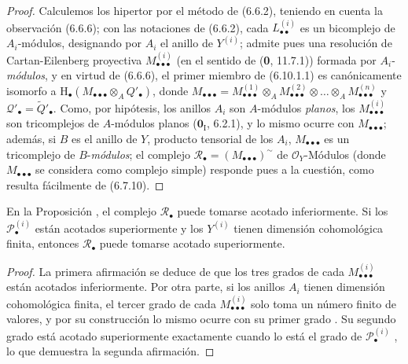 \begin{proof}
Calculemos los hipertor por el método de (6.6.2), teniendo en cuenta la observación
(6.6.6); con las notaciones de (6.6.2), cada
$L_{\bullet\bullet}^{(i)}$ es un bicomplejo de $A_i$-módulos, designando por
$A_i$ el anillo de $Y^{(i)}$; admite pues una resolución de Cartan-Eilenberg
proyectiva $M_{\bullet\bullet\bullet}^{(i)}$ (en el sentido de (\textbf{0}, 11.7.1)) formada por
$A_i$-\emph{módulos}, y en virtud de (6.6.6), el primer miembro de (6.10.1.1) es
canónicamente isomorfo a
$\mathrm H_\bullet(M_{\bullet\bullet\bullet}\otimes_A Q'_\bullet)$, donde
$M_{\bullet\bullet\bullet}=M_{\bullet\bullet\bullet}^{(1)}\otimes_A M_{\bullet\bullet\bullet}^{(2)}\otimes\ldots\otimes_A M_{\bullet\bullet\bullet}^{(n)}$
y $\mathscr Q'_\bullet=\widetilde{Q}'_\bullet$. Como, por hipótesis, los
anillos $A_i$ son $A$-módulos \emph{planos}, los
$M_{\bullet\bullet\bullet}^{(i)}$ son tricomplejos de $A$-módulos planos
($\mathbf{0}_{\mathrm I}$, 6.2.1), y lo mismo ocurre con
$M_{\bullet\bullet\bullet}$; además, si $B$ es el anillo de $Y$, producto
tensorial de los $A_i$, $M_{\bullet\bullet\bullet}$ es un tricomplejo de
$B$-\emph{módulos}; el complejo
$\mathscr R_\bullet=(M_{\bullet\bullet\bullet})^\sim$ de $\mathscr O_Y$-Módulos (donde $M_{\bullet\bullet\bullet}$ se considera como
complejo simple) responde pues a la cuestión, como resulta fácilmente de
(6.7.10).
\end{proof}

\begin{corollary}[6.10.2]
\label{III.6.10.2}
En la Proposición , el complejo
$\mathscr R_\bullet$ puede tomarse acotado inferiormente. Si los
$\mathscr P_\bullet^{(i)}$ están acotados superiormente y los
$Y^{(i)}$ tienen dimensión cohomológica finita, entonces
$\mathscr R_\bullet$ puede tomarse acotado superiormente.
\end{corollary}

\begin{proof}
La primera afirmación se deduce de que los tres grados de cada
$M_{\bullet\bullet\bullet}^{(i)}$ están acotados inferiormente.
Por otra parte, si los anillos $A_i$ tienen dimensión
cohomológica finita, el tercer grado de cada
$M_{\bullet\bullet\bullet}^{(i)}$ solo toma un número finito de
valores, y por su construcción lo mismo ocurre con su primer grado
. Su segundo grado está acotado superiormente
exactamente cuando lo está el grado de $\mathscr P_\bullet^{(i)}$
, lo que demuestra la segunda afirmación.
\end{proof}

